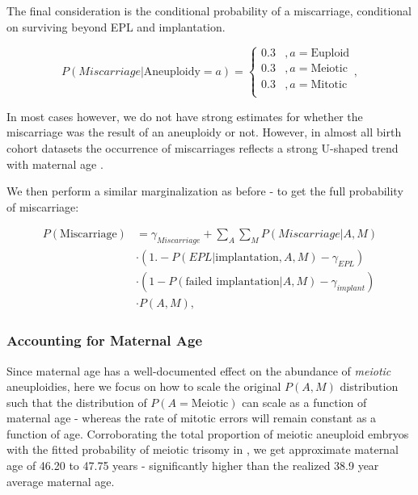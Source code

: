 \documentclass{article}
\begin{document}
The final consideration is the conditional probability of a miscarriage, conditional on surviving beyond EPL and implantation. 

\begin{equation}
	P(Miscarriage | \text{Aneuploidy}=a) = \begin{cases}
	0.3 &, a= \text{Euploid}\\
	0.3 &, a = \text{Meiotic}\\
	0.3 &, a = \text{Mitotic}\\
	\end{cases},
\end{equation}

In most cases however, we do not have strong estimates for whether the miscarriage was the result of an aneuploidy or not. However, in almost all birth cohort datasets the occurrence of miscarriages reflects a strong U-shaped trend  with maternal age \citep{Gruhn2019-al}. 

We then perform a similar marginalization as before - to get the full probability of miscarriage: 

\begin{equation}
\begin{aligned}
P(\text{Miscarriage}) &=  \gamma_{Miscarriage} + \sum_{A}\sum_{M} P(Miscarriage | A,M)\\
&\cdot (1. - P(EPL | \text{implantation}, A, M) - \gamma_{EPL})\\
&\cdot (1 - P(\text{failed implantation} | A, M) - \gamma_{implant})\\ 
&\cdot P(A, M),
\end{aligned}
\end{equation}

\subsubsection*{Accounting for Maternal Age} 

Since maternal age has a well-documented effect on the abundance of \textit{meiotic} aneuploidies, here we focus on how to scale the original $P(A,M)$ distribution such that the distribution of $P(A = \text{Meiotic})$ can scale as a function of maternal age - whereas the rate of mitotic errors will remain constant as a function of age. Corroborating the total proportion of meiotic aneuploid embryos with the fitted probability of meiotic trisomy in \citep{Gruhn2019-al}, we get approximate maternal age of 46.20 to 47.75 years - significantly higher than the realized 38.9 year average maternal age. 
\end{document}
